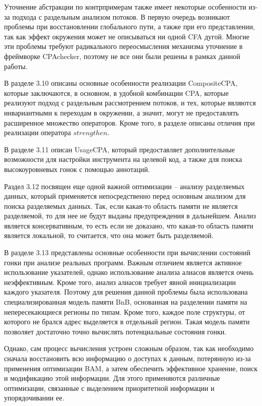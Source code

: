 Уточнение абстракции по контрпримерам также имеет некоторые особенности из-за подхода с раздельным анализом потоков.
В первую очередь возникают проблемы при восстановлении глобального пути, а также при его представлении, так как эффект окружения может не описываться ни одной CFA дугой.
Многие эти проблемы требуют радикального переосмысления механизма уточнение в фреймворке CPAchecker, поэтому не все они были решены в рамках данной работы.

В разделе 3.10 описаны основные особенности реализации CompositeCPA, которые заключаются, в основном, в удобной комбинации CPA, которые реализуют подход с раздельным рассмотрением потоков, и тех, которые являются инвариантными к переходам в окружении, а значит, могут не предоставлять расширенное множество операторов. 
Кроме того, в разделе описаны отличия при реализации оператора $strengthen$.

В разделе 3.11 описан UsageCPA, который предоставляет дополнительные возможности для настройки инструмента на целевой код, а также для поиска высокоуровневых гонок с помощью аннотаций.

Раздел 3.12 посвящен еще одной важной оптимизации -- анализу разделяемых данных, который применяется непосредственно перед основным анализом для поиска разделяемых данных.
Так, если какая-то область памяти не является разделяемой, то для нее не будут выданы предупреждения в дальнейшем.
Анализ является консервативным, то есть если не доказано, что какая-то область памяти является локальной, то считается, что она может быть разделяемой.

В разделе 3.13 представлены основные особенности при вычислении состояний гонки при анализе реальных программ.
Важным отличием является активное использование указателей, однако использование анализа алиасов является очень неэффективным.
Кроме того, анализ алиасов требует явной инициализации каждого указателя. Поэтому для решения данной проблемы была использована специализированная модель памяти BnB, основанная на разделении памяти на непересекающиеся регионы по типам.
Кроме того, каждое поле структуры, от которого не брался адрес выделяется в отдельный регион.
Такая модель памяти позволяет достаточно точно вычислять потенциальные состояния гонки.

Однако, сам процесс вычисления устроен сложным образом, так как необходимо сначала восстановить всю информацию о доступах к данным, потерянную из-за применения оптимизации BAM, а затем обеспечить эффективное хранение, поиск и модификацию этой информации.
Для этого применяются различные оптимизации, связанные с выделением приоритетной информации и упорядочивании ее. 

